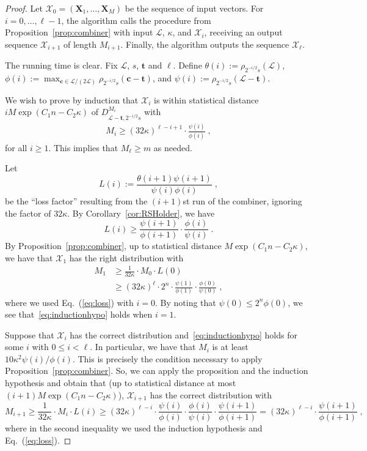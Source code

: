 \documentclass[11pt]{article}
\renewcommand{\vec}[1]{\ensuremath{\mathbf{#1}}}
\newcommand{\scarequotes}[1]{``#1''}
\newcommand{\lat}{\mathcal{L}}
\begin{document}
\begin{proof}
Let $\mathcal{X}_0 = (\vec{X}_1,\ldots, \vec{X}_M)$ be the sequence of input vectors. For $i = 0,\ldots, \ell-1$, the algorithm calls the procedure from Proposition~\ref{prop:combiner} with input $\lat$, $\kappa$, and $\mathcal{X}_i$, receiving an output sequence $\mathcal{X}_{i+1}$ of length $M_{i+1}$. Finally, the algorithm outputs the sequence $\mathcal{X}_\ell$.

The running time is clear. Fix $\lat$, $s$, $\vec{t}$ and $\ell$. Define $\theta(i) := \rho_{2^{-i/2} s}(\lat)$, $\phi(i) := \max_{\vec{c} \in \lat/(2\lat)} \rho_{2^{-i/2}s}(\vec{c} -\vec{t})$, and $\psi(i) := \rho_{2^{-i/2}s}(\lat-\vec{t})$.

 We wish to prove by induction that $\mathcal{X}_i$ is within statistical distance $i M\exp(C_1 n-C_2\kappa )$ of $D_{\lat - \vec{t},2^{-i/2}s}^{M_i}$ with 
\begin{align}
\label{eq:inductionhypo}
M_i   \geq (32\kappa)^{\ell - i + 1} \cdot \frac{\psi(i)}{\phi(i)} 
\; ,
\end{align}
for all $i \ge 1$. This implies that $M_\ell \geq m$ as needed.

Let
\[
L(i) := \frac{\theta(i+1) \psi(i+1)}{\psi(i) \phi(i)} \;,
\]
be the \scarequotes{loss factor} resulting from the $(i+1)$st run of the combiner, ignoring the factor of $32\kappa$.
By Corollary~\ref{cor:RSHolder}, we have
\begin{equation}
\label{eq:loss}
L(i) \ge \frac{\psi(i+1)}{\phi(i+1)} \cdot \frac{\phi(i)}{\psi(i)} \;. \end{equation}
By Proposition~\ref{prop:combiner}, up to statistical distance $M\exp(C_1 n-C_2\kappa )$, we have that $\mathcal{X}_1$ has the right distribution with
\begin{align*}
M_{1}   &\geq \frac{1}{32\kappa }\cdot M_0 \cdot L(0) \\
 &\ge  (32 \kappa)^{\ell} \cdot 2^n \cdot \frac{\psi(1)}{\phi(1)} \cdot \frac{\phi(0)}{\psi(0)}  
\; ,
\end{align*}
where we used Eq.~(\ref{eq:loss}) with $i=0$. 
By noting that $\psi(0) \le 2^n \phi(0)$, we see that~\eqref{eq:inductionhypo} holds when $i=1$. 

Suppose that $\mathcal{X}_i$ has the correct distribution and~\eqref{eq:inductionhypo} holds for some $i$ with $0 \leq i < \ell$. In particular, we have that $M_i$ is at least 
$10 \kappa^2 \psi(i)/\phi(i)$. This is precisely the condition
necessary to apply Proposition~\ref{prop:combiner}. So, 
we can apply the proposition and the induction hypothesis and obtain that (up to statistical distance at most $(i+1) M \exp(C_1 n - C_2 \kappa)$),
$\mathcal{X}_{i+1}$ has the correct distribution with
\[
M_{i+1}  \geq \frac{1}{32\kappa }\cdot M_i \cdot L(i)  
\ge (32\kappa)^{\ell - i} \cdot  \frac{\psi(i)}{\phi(i)} \cdot \frac{\phi(i)}{\psi(i)} \cdot \frac{\psi(i+1)}{\phi(i+1)}
= (32\kappa)^{\ell - i} \cdot  \frac{\psi(i+1)}{\phi(i+1)}
\; ,
\]
where in the second inequality we used the induction hypothesis and Eq.~(\ref{eq:loss}).
\end{proof}
\end{document}
